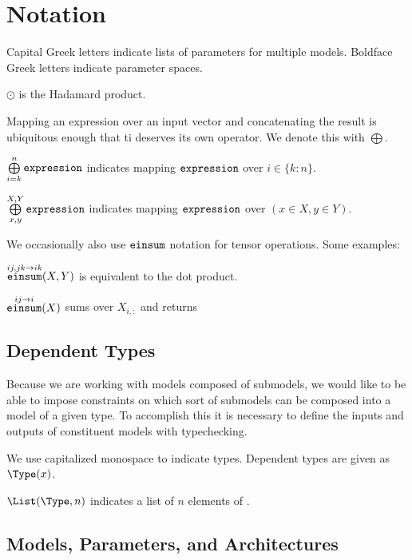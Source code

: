 \appendix

\section{Notation}
\label{app:notation}
Capital Greek letters indicate lists of parameters for multiple models.
Boldface Greek letters indicate parameter spaces.


$\odot$ is the Hadamard product.

Mapping an expression over an input vector and concatenating the result is ubiquitous enough that ti deserves its own operator.
We denote this with $\bigoplus$.

$\mathop{\bigoplus}\limits^n_{i=k}\mathop{\mathtt{expression}}\limits$ indicates mapping $\mathop{\mathtt{expression}}\limits$ over $i \in \{k:n\}$.

$\mathop{\bigoplus}\limits^{X,Y}_{x,y}\mathop{\mathtt{expression}}\limits$ indicates mapping $\mathop{\mathtt{expression}}\limits$ over $(x \in X,y \in Y)$.

We occasionally also use $\mathop{\mathtt{einsum}}\limits$\cite{} notation for tensor operations.
Some examples:

$\mathop{\mathtt{einsum}}\limits^{ij,jk \to ik}(X,Y)$ is equivalent to the dot product.

$\mathop{\mathtt{einsum}}\limits^{ij \to i}(X)$ sums over $X_{i,:}$ and returns 

\subsection{Dependent Types}

Because we are working with models composed of submodels, we would like to be able to impose constraints on which sort of submodels can be composed into a model of a given type.
To accomplish this it is necessary to define the inputs and outputs of constituent models with typechecking.


We use capitalized monospace to indicate types.
Dependent types are given as $\Type(x)$. 

$\List(\Type,n)$ indicates a list of $n$ elements of \Type.

\subsection{Models, Parameters, and Architectures}

